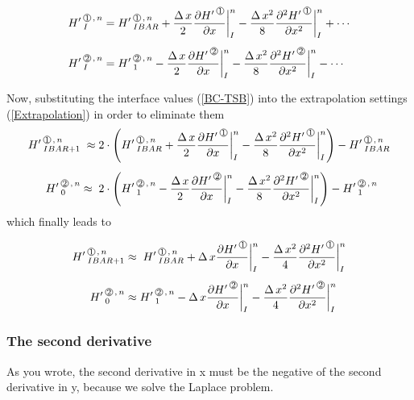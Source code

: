 \begin{align}
\label{BC-TSB}
\HL{I}{1}{n} & = \HL{IBAR}{1}{n}  + \frac{\DX}{2} \frac{\HPN{1}} {\DXP} \bigg|_{I}^n 
                                                      - \frac{\DXT}{8} \frac{\HPNT{1}} {\DXPT} \bigg|_{I}^n  + \cdots  \\[1ex]
\HL{I}{2}{n} & =  \HL{1}{2}{n}  - \frac{\DX}{2} \frac{\HPN{2}} {\DXP} \bigg|_{I}^n 
                                                - \frac{\DXT}{8}\frac{\HPNT{2}} {\DXPT} \bigg|_{I}^n  - \cdots         \nonumber                                            
\end{align}


Now, substituting the interface values (\ref{BC-TSB}) into the extrapolation settings (\ref{Extrapolation}) in order to eliminate them
\begin{align}
\HL{IBAR+1}{1}{n} & \; \approx 2 \cdot \left( \HL{IBAR}{1}{n}  + \frac{\DX}{2} \frac{\HPN{1}} {\DXP} \bigg|_{I}^n 
                                                      - \frac{\DXT}{8} \frac{\HPNT{1}} {\DXPT} \bigg|_{I}^n  \right) -  \HL{IBAR}{1}{n} \label{BC-TSDA}
 \\[1ex]
\HL{0}{2}{n} & \approx \; 2 \cdot \left( \HL{1}{2}{n}  - \frac{\DX}{2} \frac{\HPN{2}} {\DXP} \bigg|_{I}^n 
                                                - \frac{\DXT}{8}\frac{\HPNT{2}} {\DXPT} \bigg|_{I}^n \right)    -  \HL{1}{2}{n}      \nonumber                                           
\end{align}
which finally leads to

\begin{align}
\HL{IBAR+1}{1}{n} & \approx \;  \HL{IBAR}{1}{n}  + \DX \frac{\HPN{1}} {\DXP} \bigg|_{I}^n 
                                                      - \frac{\DXT}{4} \frac{\HPNT{1}} {\DXPT} \bigg|_{I}^n  \label{BC-TSDB}
 \\[1ex]
\HL{0}{2}{n} & \approx  \HL{1}{2}{n}  - \DX \frac{\HPN{2}} {\DXP} \bigg|_{I}^n 
                                                - \frac{\DXT}{4}\frac{\HPNT{2}} {\DXPT} \bigg|_{I}^n     \nonumber                                           
\end{align}

\newpage
\subsubsection{The second derivative}
As you wrote, the second derivative in x must be the negative of the second derivative in y, because we solve the Laplace problem.

